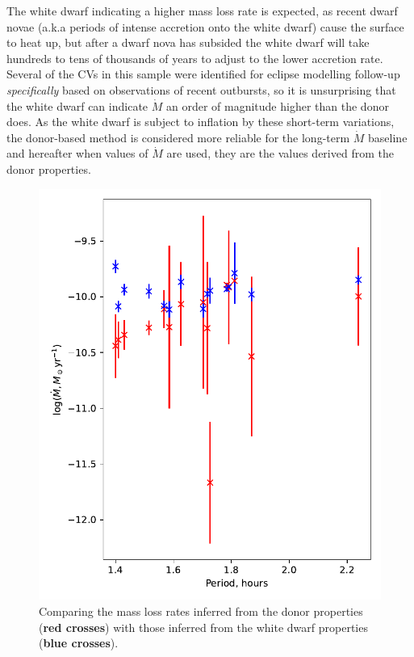 The white dwarf indicating a higher mass loss rate is expected, as recent dwarf novae (a.k.a periods of intense accretion onto the white dwarf) cause the surface to heat up, but after a dwarf nova has subsided the white dwarf will take hundreds to tens of thousands of years to adjust to the lower accretion rate.
Several of the CVs in this sample were identified for eclipse modelling follow-up \textit{specifically} based on observations of recent outbursts, so it is unsurprising that the white dwarf can indicate $\dot M$ an order of magnitude higher than the donor does. As the white dwarf is subject to inflation by these short-term variations, the donor-based method is considered more reliable for the long-term $\dot M$ baseline and hereafter when values of $\dot M$ are used, they are the values derived from the donor properties.
\begin{figure}
    \centering
    \includegraphics[width=\textwidth]{figures/results/Mdot/compare_mdot_from_donor_vs_wd_vs_period.pdf}
    \caption{Comparing the mass loss rates inferred from the donor properties ({\bf red crosses}) with those inferred from the white dwarf properties ({\bf blue crosses}).}
    \label{fig:discussion:compare Mdot from donor and WD}
\end{figure}

